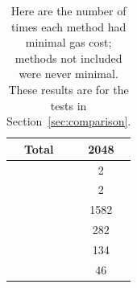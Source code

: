 \begin{table}[pt]
\centering
\begin{tabular}{|c|S[table-format=4.0]|}
\hline
Total & 2048 \\
\hline
                      \Uniswap{}         &                          2 \\
                      \OpenZeppelinTwo{} &                          2 \\
 \UnrolledThree{}   &  1582 \\
                      \WhileOne{}        &                        282 \\
                      \WhileTwo{}        &                        134 \\
                      \WhileThree{}      &                         46 \\
\hline
\end{tabular}
\caption[Minimal Gas Costs Statistics]{Here are the number of times
    each method had minimal gas cost;
    methods not included were never minimal.
    These results are for the tests in Section~\ref{sec:comparison}.
    }
\label{table:minimal_gas_costs}
\end{table}
